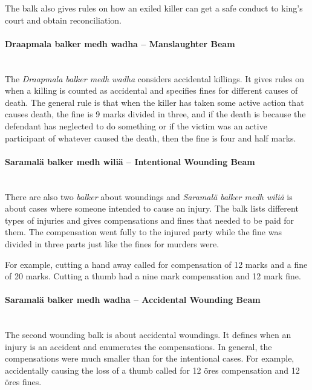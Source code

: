 \documentclass[a4paper]{article}
\begin{document}
The balk also gives rules on how an exiled killer can get a safe
conduct to king's court and obtain reconciliation.

\paragraph {Draapmala balker medh wadha – Manslaughter Beam} \mbox{}\\

The \emph{Draapmala balker medh wadha} considers accidental killings.
It gives rules on when a killing is counted as accidental and
specifies fines for different causes of death. The general rule is
that when the killer has taken some active action that causes death,
the fine is 9 marks divided in three, and if the death is because the
defendant has neglected to do something or if the victim was an active
participant of whatever caused the death, then the fine is four and
half marks.

\paragraph {Saramalä balker medh wiliä – Intentional Wounding Beam}
\mbox{}\\

There are also two \emph{balker} about woundings and \emph{Saramalä
  balker medh wiliä} is about cases where someone intended to cause an
injury. The balk lists different types of injuries and gives
compensations and fines that needed to be paid for them. The
compensation went fully to the injured party while the fine was
divided in three parts just like the fines for murders were. 

For example, cutting a hand away called for compensation of 12 marks
and a fine of 20 marks. Cutting a thumb had a nine mark compensation
and 12 mark fine.

\paragraph {Saramalä balker medh wadha – Accidental Wounding Beam}
\mbox{}\\

The second wounding balk is about accidental woundings. It defines
when an injury is an accident and enumerates the compensations. In
general, the compensations were much smaller than for the intentional
cases. For example, accidentally causing the loss of a thumb called
for 12 öres compensation and 12 öres fines.
\end{document}
